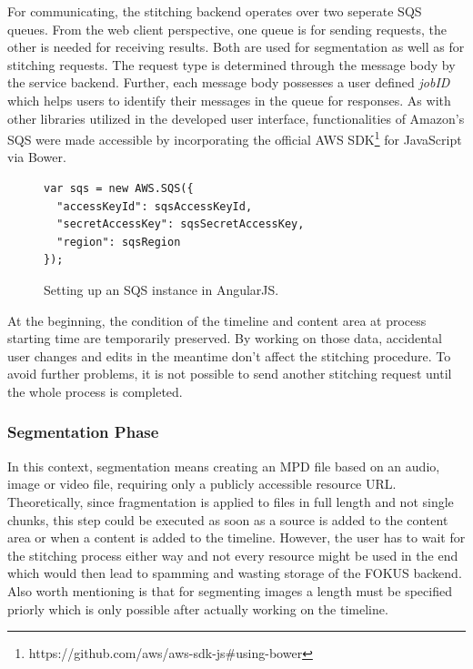 \documentclass[conference]{IEEEtran}
\begin{document}
For communicating, the stitching backend operates over two seperate SQS queues.
From the web client perspective, one queue is for sending requests, the other is needed for receiving results.
Both are used for segmentation as well as for stitching requests.
The request type is determined through the message body by the service backend.
Further, each message body possesses a user defined \textit{jobID} which helps users to identify their messages in the queue for responses.
As with other libraries utilized in the developed user interface, functionalities of Amazon's SQS were made accessible by incorporating the official AWS SDK\footnote{https://github.com/aws/aws-sdk-js\#using-bower} for JavaScript via Bower.
\begin{figure}[H]
\begin{lstlisting}
var sqs = new AWS.SQS({
  "accessKeyId": sqsAccessKeyId,
  "secretAccessKey": sqsSecretAccessKey,
  "region": sqsRegion
});
\end{lstlisting}
\caption{Setting up an SQS instance in AngularJS.}
\end{figure}
At the beginning, the condition of the timeline and content area at process starting time are temporarily preserved.
By working on those data, accidental user changes and edits in the meantime don't affect the stitching procedure.
To avoid further problems, it is not possible to send another stitching request until the whole process is completed.
\\
\subsubsection{Segmentation Phase}
In this context, segmentation means creating an MPD file based on an audio, image or video file, requiring only a publicly accessible resource URL.
Theoretically, since fragmentation is applied to files in full length and not single chunks, this step could be executed as soon as a source is added to the content area or when a content is added to the timeline.
However, the user has to wait for the stitching process either way and not every resource might be used in the end which would then lead to spamming and wasting storage of the FOKUS backend.
Also worth mentioning is that for segmenting images a length must be specified priorly which is only possible after actually working on the timeline.
\end{document}

